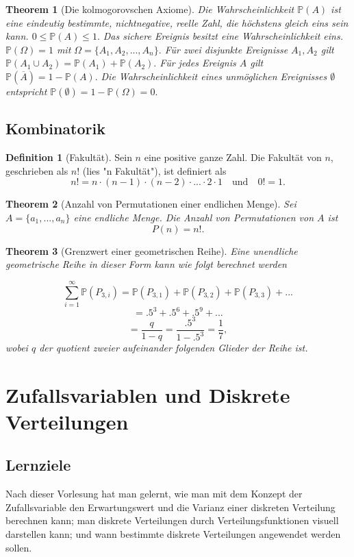 \documentclass{article}
\newtheorem{theorem}{Theorem}
\theoremstyle{definition}
\newtheorem{definition}{Definition}
\theoremstyle{exercise}
\theoremstyle{solution}
\theoremstyle{lemma}
\begin{document}
\begin{theorem}[Die kolmogorovschen Axiome]
Die Wahrscheinlichkeit $\mathbb{P}(A)$ ist eine eindeutig bestimmte, nichtnegative, reelle Zahl, die höchstens gleich eins sein kann. $0\leq \mathbb{P}(A)\leq 1.$ Das sichere Ereignis besitzt eine Wahrscheinlichkeit eins. $\mathbb{P}(\Omega)=1$ mit $\Omega=\{A_1,A_2,...,A_n\}.$ Für zwei disjunkte Ereignisse $A_1, A_2$ gilt $\mathbb{P}(A_1 \cup A_2)=\mathbb{P}(A_1)+\mathbb{P}(A_2).$ Für jedes Ereignis $A$ gilt $\mathbb{P}(\overline{A})=1-\mathbb{P}(A).$ Die Wahrscheinlichkeit eines unmöglichen Ereignisses $\emptyset$ entspricht $\mathbb{P}(\emptyset)=1-\mathbb{P}(\Omega)=0.$

\end{theorem}

\subsection{Kombinatorik}

\begin{definition}[Fakultät]
Sein $n$ eine positive ganze Zahl. Die Fakultät von $n$, geschrieben als $n!$ (lies "n Fakultät"), ist definiert als
\[ n!=n\cdot (n-1) \cdot (n-2) \cdot ... \cdot 2 \cdot 1 \quad \text{und} \quad 0! = 1.\]
\end{definition}

\begin{theorem}[Anzahl von Permutationen einer endlichen Menge]
Sei $A=\{a_1,...,a_n\}$ eine endliche Menge. Die Anzahl von Permutationen von $A$ ist
\[P(n)=n!.\]
\end{theorem}

\begin{theorem}[Grenzwert einer geometrischen Reihe]
Eine unendliche geometrische Reihe in dieser Form kann wie folgt berechnet werden

\[ \sum_{i=1}^{\infty}\mathbb{P}(P_{3,i})=\mathbb{P}(P_{3,1})+\mathbb{P}(P_{3,2})+\mathbb{P}(P_{3,3})+... \]
\[ =.5^3+.5^6+.5^9 +... \]
\[ =\frac{q}{1-q}=\frac{.5^3}{1-.5^3}=\frac{1}{7}, \]
wobei \(q\) der quotient zweier aufeinander folgenden Glieder der Reihe ist.

\end{theorem}


\section{Zufallsvariablen und Diskrete Verteilungen}
\subsection{Lernziele}
Nach dieser Vorlesung hat man gelernt, wie man mit dem Konzept der Zufallsvariable den Erwartungswert und die Varianz einer diskreten Verteilung berechnen kann; man diskrete Verteilungen durch Verteilungsfunktionen visuell darstellen kann; und wann bestimmte diskrete Verteilungen angewendet werden sollen.
\end{document}
